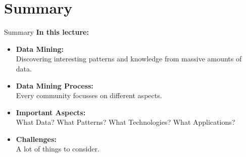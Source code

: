 \section{Summary}

\begin{frame}{Summary}
	\textbf{In this lecture:}\\
	\begin{itemize}
		\item \textbf{Data Mining:} \\ Discovering interesting patterns and knowledge from massive amounts of
		      data.
		\item \textbf{Data Mining Process:} \\ Every community focusses on different aspects.
		\item \textbf{Important Aspects:} \\ What Data? What Patterns? What Technologies? What
		      Applications?
		\item \textbf{Challenges:} \\ A lot of things to consider.
	\end{itemize}
\end{frame}
